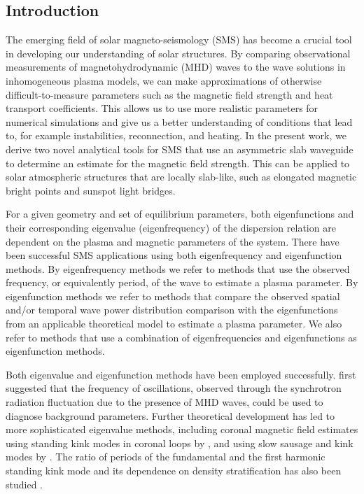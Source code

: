 \documentclass[namedreferences]{solarphysics}
\numberwithin{equation}{section}
\begin{document}
\begin{article}
\section{Introduction}
The emerging field of solar magneto-seismology (SMS) has become a crucial tool in developing our understanding of solar structures. By comparing observational measurements of magnetohydrodynamic (MHD) waves to the wave solutions in inhomogeneous plasma models, we can make approximations of otherwise difficult-to-measure parameters such as the magnetic field strength and heat transport coefficients. This allows us to use more realistic parameters for numerical simulations and give us a better understanding of conditions that lead to, for example instabilities, reconnection, and heating. In the present work, we derive two novel analytical tools for SMS that use an asymmetric slab waveguide to determine an estimate for the magnetic field strength. This can be applied to solar atmospheric structures that are locally slab-like, such as elongated magnetic bright points and sunspot light bridges.

For a given geometry and set of equilibrium parameters, both eigenfunctions and their corresponding eigenvalue (eigenfrequency) of the dispersion relation are dependent on the plasma and magnetic parameters of the system. There have been successful SMS applications using both eigenfrequency and eigenfunction methods. By eigenfrequency methods we refer to methods that use the observed frequency, or equivalently period, of the wave to estimate a plasma parameter. By eigenfunction methods we refer to methods that compare the observed spatial and/or temporal wave power distribution comparison with the eigenfunctions from an applicable theoretical model to estimate a plasma parameter. We also refer to methods that use a combination of eigenfrequencies and eigenfunctions as eigenfunction methods.

Both eigenvalue and eigenfunction methods have been employed successfully. \cite{ros70} first suggested that the frequency of oscillations, observed through the synchrotron radiation fluctuation due to the presence of MHD waves, could be used to diagnose background parameters. Further theoretical development has led to more sophisticated eigenvalue methods, including coronal magnetic field estimates using standing kink modes in coronal loops by \cite{nak_etal01}, and using slow sausage and kink modes by \cite{erd_etal08}. The ratio of periods of the fundamental and the first harmonic standing kink mode and its dependence on density stratification has also been studied \citep{ban_etal07,erd_etal14}.


\end{article}
\end{document}
